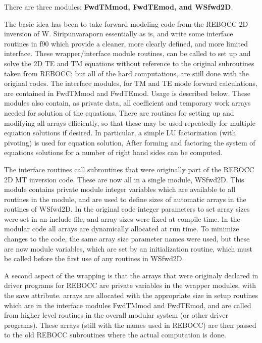\documentclass[12pt]{article}
\begin{document}
There are three modules: {\bf FwdTMmod, FwdTEmod, and WSfwd2D}.

The basic idea has been to take forward modeling
code from the REBOCC 2D inversion of W. Siripunvaraporn essentially as is,
and write some interface routines in f90 which provide
a cleaner, more clearly defined, and more limited interface.
These wrapper/interface module routines, can be called to set up and solve the
2D TE and TM equations without reference to the original subroutines
taken from REBOCC; but all of the hard computations, are still 
done with the original codes.  The interface modules,
for TM and TE mode forward calculations, are 
contained in FwdTMmod and FwdTEmod.
Usage is described below.  These modules also contain, 
as private data, all coefficient and temporary work arrays 
needed for solution of the equations.  There are routines 
for setting up and modifying all arrays efficiently, so that
these may be used repeatedly for multiple equation
solutions if desired.  In particular, a simple LU
factorization (with pivoting) is used for equation solution,
After forming and factoring the system of equations
solutions for a number of right hand sides can be computed.

The interface routines call subroutines that were originally
part of the REBOCC 2D MT inversion code.  These
are now all in a single module, WSfwd2D.
This module contains private module integer variables 
which are available to all routines in the module, and are used
to define sizes of automatic arrays in the routines of WSfwd2D.  
In the original code integer parameters to set array sizes
were set in an include file, and array sizes were fixed 
at compile time.  In the modular code all arrays are 
dynamically allocated at run time.
To minimize changes to the code, the same array size
parameter names were used, but these are now module variables,
which are set by an initialization routine, which must be
called before the first use of any routines in WSfwd2D.

A second aspect of the wrapping is that the arrays that
were originaly declared in driver programs for REBOCC are
private variables in the wrapper modules, with the save attribute.
arrays are allocated with the appropriate size in setup routines
which are in the interface modules FwdTMmod and FwdTEmod, and
are called from higher level routines in the overall modular
system (or other driver programs).   These arrays (still with
the names used in REBOCC) are then passed to the old REBOCC 
subroutines where the actual computation is done.  
\end{document}
